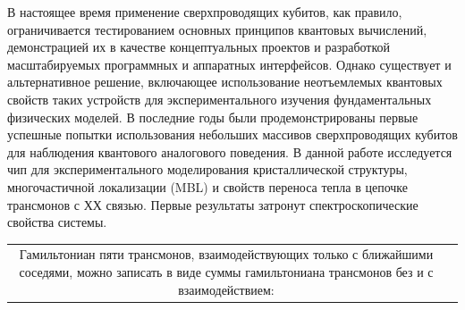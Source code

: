 \documentclass[a0, portrait]{a0poster}
\begin{document}
\vspace{-1.5cm}
\begin{multicols}{2}	



\begin{tcolorbox}[left=1cm, right=1cm, top=0.5cm, bottom=0.5cm, 
                  title={\Large Предисловие}, bottomtitle=.5cm,toptitle=.5cm]
\begingroup
\setlength{\columnsep}{1cm}
В настоящее время применение сверхпроводящих кубитов, как правило, ограничивается тестированием основных принципов квантовых вычислений, демонстрацией их в качестве концептуальных проектов и разработкой масштабируемых программных и аппаратных интерфейсов. Однако существует и альтернативное решение, включающее использование неотъемлемых квантовых свойств таких устройств для экспериментального изучения фундаментальных физических моделей. В последние годы были продемонстрированы первые успешные попытки\cite{li2018perfect}\cite{macha2014implementation}\cite{roushan2017spectroscopic} использования небольших массивов сверхпроводящих кубитов для наблюдения квантового аналогового поведения. В данной работе исследуется чип для экспериментального моделирования кристаллической структуры, многочастичной локализации (MBL) и свойств переноса тепла в цепочке трансмонов с ХХ связью. Первые результаты затронут спектроскопические свойства системы.
\endgroup
\end{tcolorbox}


\begin{tcolorbox}[left=1cm, right=1cm, top=0.5cm, bottom=0.5cm, 
                  title={\Large Контекст исследования}, bottomtitle=.3cm,toptitle=.5cm
                  ]
\begin{tabular}{cc}
	\begin{minipage}{0.5\textwidth}
		Гамильтониан пяти трансмонов, взаимодействующих только с ближайшими соседями, можно записать в виде суммы гамильтониана трансмонов без и с взаимодействием:               
		

\end{minipage}
\end{tabular}
\end{tcolorbox}
\end{multicols}
\end{document}

